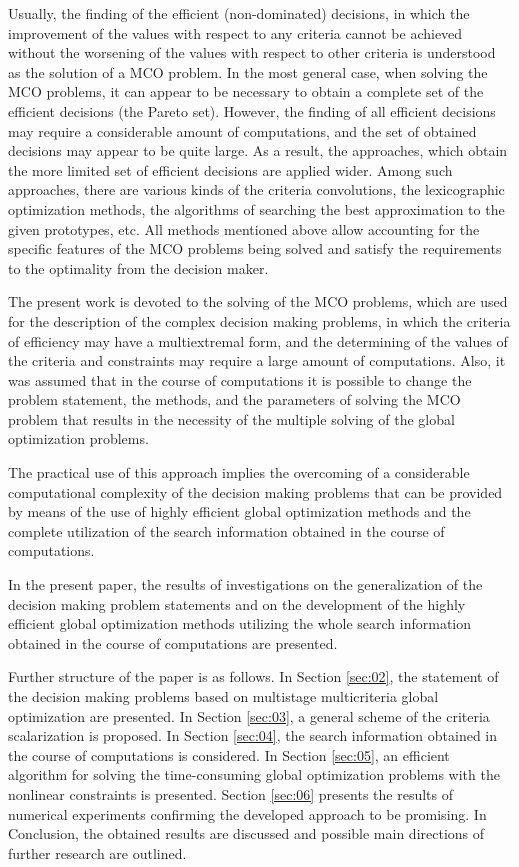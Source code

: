\documentclass[runningheads]{llncs}
\begin{document}
Usually, the finding of the efficient (non-dominated) decisions, in which the improvement of the values with respect to any criteria cannot be achieved without the worsening of the values with respect to other criteria is understood as the solution of a MCO problem. In the most general case, when solving the MCO problems, it can appear to be necessary to obtain a complete set of the efficient decisions (the Pareto set). However, the finding of all efficient decisions may require a considerable amount of computations, and the set of obtained decisions may appear to be quite large. As a result, the approaches, which obtain the more limited set of efficient decisions are applied wider. Among such approaches, there are various kinds of the criteria convolutions, the lexicographic optimization methods, the algorithms of searching the best approximation to the given prototypes, etc. All methods mentioned above allow accounting for the specific features of the MCO problems being solved and satisfy the requirements to the optimality from the decision maker. 

The present work is devoted to the solving of the MCO problems, which are used for the description of the complex decision making problems, in which the criteria of efficiency may have a multiextremal form, and the determining of the values of the criteria and constraints may require a large amount of computations. Also, it was assumed that in the course of computations it is possible to change the problem statement, the methods, and the parameters of solving the MCO problem that results in the necessity of the multiple solving of the global optimization problems. 

The practical use of this approach implies the overcoming of a considerable computational complexity of the decision making problems that can be provided by means of the use of highly efficient global optimization methods and the complete utilization of the search information obtained in the course of computations.

In the present paper, the results of investigations on the generalization of the decision making problem statements \cite{c6,c7} and on the development of the highly efficient global optimization methods utilizing the whole search information obtained in the course of computations \cite{c8,c9,c10} are presented.

Further structure of the paper is as follows. In Section \ref{sec:02}, the statement of the decision making problems based on multistage multicriteria global optimization are presented. In Section \ref{sec:03}, a general scheme of the criteria scalarization is proposed. In Section \ref{sec:04}, the search information obtained in the course of computations is considered. In Section \ref{sec:05}, an efficient algorithm for solving the time-consuming global optimization problems with the nonlinear constraints is presented. Section \ref{sec:06} presents the results of numerical experiments confirming the developed approach to be promising. In Conclusion, the obtained results are discussed and possible main directions of further research are outlined.
\end{document}
